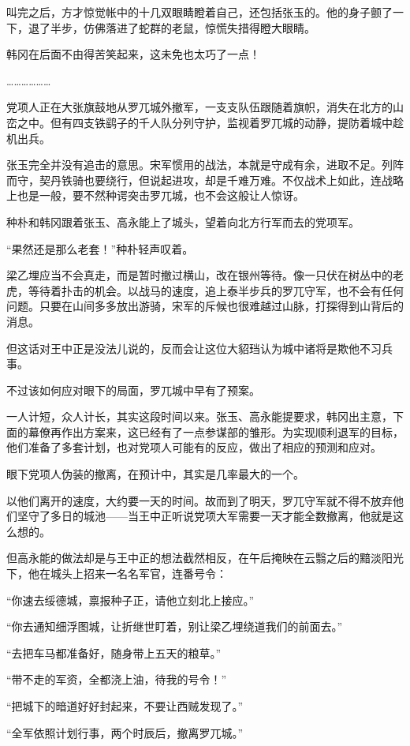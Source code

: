 叫完之后，方才惊觉帐中的十几双眼睛瞪着自己，还包括张玉的。他的身子颤了一下，退了半步，仿佛落进了蛇群的老鼠，惊慌失措得瞪大眼睛。

韩冈在后面不由得苦笑起来，这未免也太巧了一点！

………………

党项人正在大张旗鼓地从罗兀城外撤军，一支支队伍跟随着旗帜，消失在北方的山峦之中。但有四支铁鹞子的千人队分列守护，监视着罗兀城的动静，提防着城中趁机出兵。

张玉完全并没有追击的意思。宋军惯用的战法，本就是守成有余，进取不足。列阵而守，契丹铁骑也要绕行，但说起进攻，却是千难万难。不仅战术上如此，连战略上也是一般，要不然种谔突击罗兀城，也不会这般让人惊讶。

种朴和韩冈跟着张玉、高永能上了城头，望着向北方行军而去的党项军。

“果然还是那么老套！”种朴轻声叹着。

梁乙埋应当不会真走，而是暂时撤过横山，改在银州等待。像一只伏在树丛中的老虎，等待着扑击的机会。以战马的速度，追上泰半步兵的罗兀守军，也不会有任何问题。只要在山间多多放出游骑，宋军的斥候也很难越过山脉，打探得到山背后的消息。

但这话对王中正是没法儿说的，反而会让这位大貂珰认为城中诸将是欺他不习兵事。

不过该如何应对眼下的局面，罗兀城中早有了预案。

一人计短，众人计长，其实这段时间以来。张玉、高永能提要求，韩冈出主意，下面的幕僚再作出方案来，这已经有了一点参谋部的雏形。为实现顺利退军的目标，他们准备了多套计划，也对党项人可能有的反应，做出了相应的预测和应对。

眼下党项人伪装的撤离，在预计中，其实是几率最大的一个。

以他们离开的速度，大约要一天的时间。故而到了明天，罗兀守军就不得不放弃他们坚守了多日的城池——当王中正听说党项大军需要一天才能全数撤离，他就是这么想的。

但高永能的做法却是与王中正的想法截然相反，在午后掩映在云翳之后的黯淡阳光下，他在城头上招来一名名军官，连番号令：

“你速去绥德城，禀报种子正，请他立刻北上接应。”

“你去通知细浮图城，让折继世盯着，别让梁乙埋绕道我们的前面去。”

“去把车马都准备好，随身带上五天的粮草。”

“带不走的军资，全都浇上油，待我的号令！”

“把城下的暗道好好封起来，不要让西贼发现了。”

“全军依照计划行事，两个时辰后，撤离罗兀城。”

